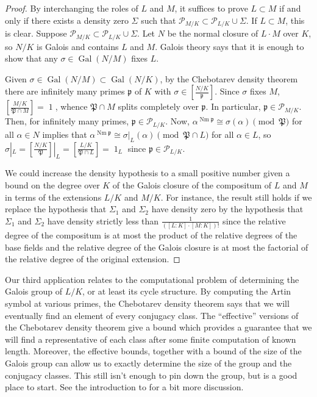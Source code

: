 \documentclass[12pt]{amsart}
\theoremstyle{definition}
\theoremstyle{remark}
\numberwithin{equation}{section}
\newcommand{\cP}{\mathcal P}
\newcommand{\fkp}{\mathfrak p}
\newcommand{\fkP}{\mathfrak{P}}
\DeclareMathOperator{\norm}{Nm}
\DeclareMathOperator{\id}{1}
\newcommand{\artin}[2]{\left[ \frac{#1}{#2}\right]}
\DeclareMathOperator{\Gal}{Gal}
\begin{document}
\begin{proof}
By interchanging the roles of $L$ and $M$, it suffices to prove $L \subset M$ if and only if there exists a density zero $\Sigma$ such that $\cP_{M/K} \subset \cP_{L/K} \cup \Sigma$. If $L \subset M$, this is clear.
Suppose $\cP_{M/K} \subset \cP_{L/K} \cup \Sigma$.
Let $N$ be the normal closure of $L\cdot M$ over $K$, so $N/K$ is Galois and contains $L$ and $M$. Galois theory says that it is enough to show that any $\sigma \in \Gal(N/M)$ fixes $L$.

Given $\sigma \in \Gal(N/M) \subset \Gal(N/K)$, by the Chebotarev density theorem there are infinitely many primes $\fkp$ of $K$  with $\sigma \in \artin{N/K}{\fkp}$. Since $\sigma$ fixes $M$, $\artin{M/K}{\fkP \cap M} = \id$, whence $\fkP \cap M$ splits completely over $\fkp$. In particular, $\fkp \in \cP_{M/K}$. Then, for infinitely many primes, $\fkp \in \cP_{L/K}$. Now, $\alpha^{\norm \fkp} \cong \sigma(\alpha) \pmod{\fkP}$ for all $\alpha \in N$ implies that $\alpha^{\norm \fkp} \cong \sigma|_{L}(\alpha) \pmod{\fkP \cap L}$ for all $\alpha \in L$, so $\sigma|_{L} = \artin{N/K}{\fkP}|_{L} =\artin{L/K}{\fkP \cap L} =  \id_{L}$ since $\fkp \in \cP_{L/K}$.

We could increase the density hypothesis to a small positive number given a bound on the degree over $K$ of the Galois closure of the compositum of $L$ and $M$ in terms of the extensions $L/K$ and $M/K$. For instance, the result still holds if we replace the hypothesis that $\Sigma_{1}$ and $\Sigma_{2}$ have density zero by the hypothesis that $\Sigma_{1}$ and $\Sigma_{2}$ have density strictly less than $\frac{1}{([L:K] \cdot [M:K])!}$ since the relative degree of the compositum is at most the product of the relative degrees of the base fields and the relative degree of the Galois closure is at most the factorial of the relative degree of the original extension.
\end{proof}

Our third application relates to the computational problem of determining the Galois group of $L/K$, or at least its cycle structure. By computing the Artin symbol at various primes, the Chebotarev density theorem says that we will eventually find an element of every conjugacy class. The ``effective'' versions of the Chebotarev density theorem give a bound which provides a guarantee that we will find a representative of each class after some finite computation of known length. Moreover, the effective bounds, together with a bound of the size of the Galois group can allow us to exactly determine the size of the group and the conjugacy classes. This still isn't enough to pin down the group, but is a good place to start. See the introduction to \cite{LagariasOdlyzko77} for a bit more discussion.
\end{document}
